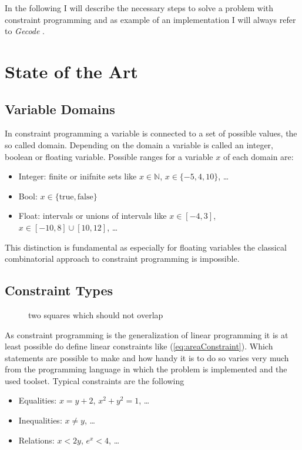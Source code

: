 \documentclass[10pt,
               a4paper,
               journal,
               ]{IEEEtran}
\newcommand{\refeq}[1]{{(\ref{#1})}}
\begin{document}
	In the following I will describe the necessary steps to solve a problem with constraint programming and as example of an implementation I will always refer to \emph{Gecode} \cite{gecode}.
	
	\section{State of the Art}
	\subsection{Variable Domains}
	In constraint programming a variable is connected to a set of possible values, the so called domain. Depending on the domain a variable is called an integer, boolean or floating variable. Possible ranges for a variable $x$ of each domain are:
	\begin{itemize}
		\item Integer: finite or inifnite sets like $x \in \mathbb{N}$, $x \in \{-5, 4, 10\}$, \dots
		\item Bool: $x \in \{\text{true}, \text{false}\}$
		\item Float: intervals or unions of intervals like $x \in [-4, 3]$, $x \in [-10, 8] \cup [10, 12]$, \dots
	\end{itemize}
	This distinction is fundamental as especially for floating variables the classical combinatorial approach to constraint programming is impossible.
	
	\subsection{Constraint Types}
	
	\begin{figure}
	\center
	\caption{two squares which should not overlap}
	\label{fig:squares}
	\end{figure}
	
	As constraint programming is the generalization of linear programming it is at least possible do define linear constraints like \refeq{eq:areaConstraint}. Which statements are possible to make and how handy it is to do so varies very much from the programming language in which the problem is implemented and the used toolset. Typical constraints are the following
	\begin{itemize}
		\item Equalities: $x = y + 2$, $x^2 + y^2 = 1$, \dots
		\item Inequalities: $x \ne y$, \dots
		\item Relations: $x < 2 y$, $e^x < 4$, \dots
	\end{itemize}
	
\end{document}
